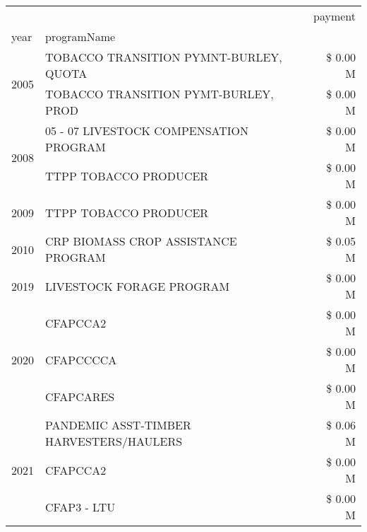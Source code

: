 \begin{tabular}{llr}
\toprule
 &  & payment \\
year & programName &  \\
\midrule
\multirow[t]{2}{*}{2005} & TOBACCO TRANSITION PYMNT-BURLEY, QUOTA & \$ 0.00 M \\
 & TOBACCO TRANSITION PYMT-BURLEY, PROD & \$ 0.00 M \\
\cline{1-3}
\multirow[t]{2}{*}{2008} & 05 - 07 LIVESTOCK COMPENSATION PROGRAM & \$ 0.00 M \\
 & TTPP TOBACCO PRODUCER & \$ 0.00 M \\
\cline{1-3}
2009 & TTPP TOBACCO PRODUCER & \$ 0.00 M \\
\cline{1-3}
2010 & CRP BIOMASS CROP ASSISTANCE PROGRAM & \$ 0.05 M \\
\cline{1-3}
2019 & LIVESTOCK FORAGE PROGRAM & \$ 0.00 M \\
\cline{1-3}
\multirow[t]{3}{*}{2020} & CFAPCCA2 & \$ 0.00 M \\
 & CFAPCCCCA & \$ 0.00 M \\
 & CFAPCARES & \$ 0.00 M \\
\cline{1-3}
\multirow[t]{3}{*}{2021} & PANDEMIC ASST-TIMBER HARVESTERS/HAULERS & \$ 0.06 M \\
 & CFAPCCA2 & \$ 0.00 M \\
 & CFAP3 - LTU & \$ 0.00 M \\
\cline{1-3}
\bottomrule
\end{tabular}
